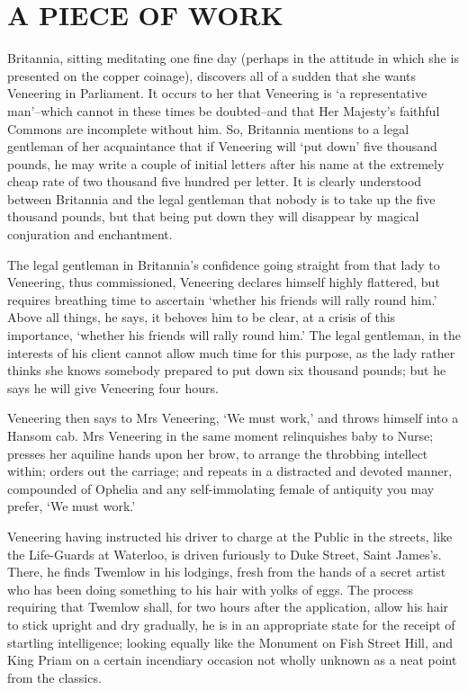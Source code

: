 
\chapter{A PIECE OF WORK}

Britannia, sitting meditating one fine day (perhaps in the attitude in
which she is presented on the copper coinage), discovers all of a sudden
that she wants Veneering in Parliament. It occurs to her that Veneering
is ‘a representative man’--which cannot in these times be doubted--and
that Her Majesty’s faithful Commons are incomplete without him. So,
Britannia mentions to a legal gentleman of her acquaintance that if
Veneering will ‘put down’ five thousand pounds, he may write a couple
of initial letters after his name at the extremely cheap rate of two
thousand five hundred per letter. It is clearly understood between
Britannia and the legal gentleman that nobody is to take up the five
thousand pounds, but that being put down they will disappear by magical
conjuration and enchantment.

The legal gentleman in Britannia’s confidence going straight from that
lady to Veneering, thus commissioned, Veneering declares himself highly
flattered, but requires breathing time to ascertain ‘whether his friends
will rally round him.’ Above all things, he says, it behoves him to be
clear, at a crisis of this importance, ‘whether his friends will rally
round him.’ The legal gentleman, in the interests of his client cannot
allow much time for this purpose, as the lady rather thinks she knows
somebody prepared to put down six thousand pounds; but he says he will
give Veneering four hours.

Veneering then says to Mrs Veneering, ‘We must work,’ and throws himself
into a Hansom cab. Mrs Veneering in the same moment relinquishes baby
to Nurse; presses her aquiline hands upon her brow, to arrange the
throbbing intellect within; orders out the carriage; and repeats in
a distracted and devoted manner, compounded of Ophelia and any
self-immolating female of antiquity you may prefer, ‘We must work.’

Veneering having instructed his driver to charge at the Public in the
streets, like the Life-Guards at Waterloo, is driven furiously to Duke
Street, Saint James’s. There, he finds Twemlow in his lodgings, fresh
from the hands of a secret artist who has been doing something to his
hair with yolks of eggs. The process requiring that Twemlow shall, for
two hours after the application, allow his hair to stick upright and dry
gradually, he is in an appropriate state for the receipt of startling
intelligence; looking equally like the Monument on Fish Street Hill, and
King Priam on a certain incendiary occasion not wholly unknown as a neat
point from the classics.

